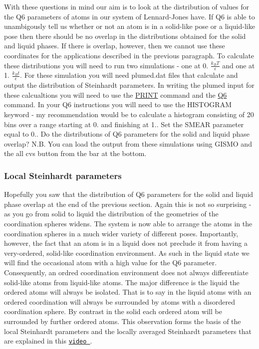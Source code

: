 With these questions in mind our aim is to look at the distribution of values for the Q6 parameters of atoms in our system of Lennard-\/\+Jones have. If Q6 is able to unambigously tell us whether or not an atom is in a solid-\/like pose or a liquid-\/like pose then there should be no overlap in the distributions obtained for the solid and liquid phases. If there is overlap, however, then we cannot use these coordinates for the applications described in the previous paragraph. To calculate these distributions you will need to run two simulations -\/ one at 0. $\frac{k_B T}{\epsilon}$ and one at 1. $\frac{k_Bt}{\epsilon}$. For these simulation you will need plumed.\+dat files that calculate and output the distribution of Steinhardt parameters. In writing the plumed input for these calcualtions you will need to use the \hyperlink{PRINT}{P\+R\+I\+N\+T} command and the \hyperlink{Q6}{Q6} command. In your Q6 instructions you will need to use the H\+I\+S\+T\+O\+G\+R\+A\+M keyword -\/ my recommendation would be to calculate a histogram consisting of 20 bins over a range starting at 0. and finishing at 1.. Set the S\+M\+E\+A\+R parameter equal to 0.. Do the distributions of Q6 parameters for the solid and liquid phase overlap? N.\+B. You can load the output from these simulations using G\+I\+S\+M\+O and the all cvs button from the bar at the bottom.\hypertarget{belfast-10_links}{}\subsubsection{Local Steinhardt parameters}\label{belfast-10_links}
Hopefully you saw that the distribution of Q6 parameters for the solid and liquid phase overlap at the end of the previous section. Again this is not so surprising -\/ as you go from solid to liquid the distribution of the geometries of the coordination spheres widens. The system is now able to arrange the atoms in the coordination spheres in a much wider variety of different poses. Importantly, however, the fact that an atom is in a liquid does not preclude it from having a very-\/ordered, solid-\/like coordination environment. As such in the liquid state we will find the occasional atom with a high value for the Q6 parameter. Consequently, an ordred coordination environment does not always differentiate solid-\/like atoms from liquid-\/like atoms. The major difference is the liquid the ordered atoms will always be isolated. That is to say in the liquid atoms with an ordered coordination will always be surrounded by atoms with a disordered coordination sphere. By contrast in the solid each ordered atom will be surrounded by further ordered atoms. This observation forms the basis of the local Steinhardt parameters and the locally averaged Steinhardt parameters that are explained in this \href{https://www.youtube.com/watch?v=JBtIs5qYIPE&feature=youtu.be}{\tt video }.

